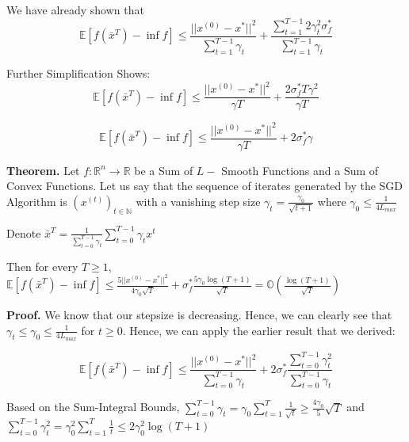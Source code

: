 We have already shown that
\begin{equation}
    \mathbb{E} [f(\bar{x}^T) - \inf f] \leq \frac{||x^{(0)} - x^*||^2}{\sum_{t = 1}^{T - 1} \gamma_t} + \frac{\sum_{t=1}^{T - 1} 2 \gamma_t^2 \sigma_f^*}{\sum_{t = 1}^{T - 1} \gamma_t}
\end{equation}

Further Simplification Shows: 
\begin{equation}
    \mathbb{E} [f(\bar{x}^T) - \inf f] \leq \frac{||x^{(0)} - x^*||^2}{\gamma T} + \frac{2 \sigma_f^* T\gamma^2}{\gamma T}
\end{equation}

\begin{equation}
    \mathbb{E} [f(\bar{x}^T) - \inf f] \leq \frac{||x^{(0)} - x^*||^2}{\gamma T} + 2 \sigma_f^* \gamma
\end{equation}

\noindent \textbf{Theorem.} Let $f: \mathbb{R}^n \rightarrow \mathbb{R}$ be a Sum of $L-$ Smooth Functions and a Sum of Convex Functions. Let us say that the sequence of iterates generated by the SGD Algorithm is $(x^{(t)})_{t \in \mathbb{N}}$ with a vanishing step size $\gamma_t = \frac{\gamma_0}{\sqrt{t + 1}}$ where $\gamma_0 \leq \frac{1}{4L_{max}}$ 

\noindent Denote $\bar{x}^T = \frac{1}{\sum_{t = 0}^{T - 1} \gamma_t} \sum_{t = 0}^{T - 1} \gamma_t x^t$ \newline 

\noindent Then for every $T \geq 1$, $\mathbb{E}[f(\bar{x}^T) - \inf f] \leq \frac{5 ||x^{(0)} - x^*||^2}{4 \gamma_0 \sqrt{T}} + \sigma_f^* \frac{5 \gamma_0 \log{(T + 1)}}{\sqrt{T}} = \mathbb{O}(\frac{\log{(T + 1)}}{\sqrt{T}})$ \newline 

\noindent \textbf{Proof.} We know that our stepsize is decreasing. Hence, we can clearly see that $\gamma_t \leq \gamma_0 \leq \frac{1}{4L_{max}}$ for $t \geq 0$. Hence, we can apply the earlier result that we derived: \newline 

\begin{equation}
    \mathbb{E}[f(\bar{x}^T) - \inf f] \leq \frac{||x^{(0)} - x^*||^2}{\sum_{t = 0}^{T - 1} \gamma_t} + 2\sigma_f^* \frac{\sum_{t = 0}^{T - 1} \gamma_t^2}{\sum_{t = 0}^{T - 1} \gamma_t}
\end{equation}

\noindent Based on the Sum-Integral Bounds,  $\sum_{t = 0}^{T - 1} \gamma_t = \gamma_0 \sum_{t = 1}^{T} \frac{1}{\sqrt{t}} \geq \frac{4\gamma_0}{5} \sqrt{T}$ and $\sum_{t = 0}^{T - 1} \gamma_t^2 = \gamma_0^2 \sum_{t = 1}^{T} \frac{1}{t} \leq 2 \gamma_0^2 \log(T + 1)$ \newline

